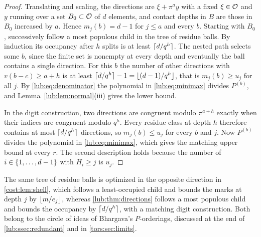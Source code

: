 \begin{proof}
Translating and scaling, the directions are $\xi+\pi^ay$ with a fixed $\xi\in\mathcal{O}$ and $y$
running over a set $B_0\subset\mathcal{O}$ of $d$ elements, and contact depths in $B$ are those in
$B_0$ increased by $a$. Hence $m_j(b)=d-1$ for
$j\le a$ and every $b$. Starting with $B_0$, successively follow a most populous child in
the tree of residue balls. By induction its occupancy after $h$ splits is at least
$\lceil d/q^h\rceil$. The nested path selects some $b$, since the finite set is nonempty at every
depth and eventually the ball contains a single direction. For this $b$ the number of
other directions with $v(b-c)\ge a+h$ is at least
$\lceil d/q^h\rceil-1=\lfloor(d-1)/q^h\rfloor$, that is $m_j(b)\ge u_j$ for all $j$. By
\eqref{lub:eq:denominator} the polynomial in \eqref{lub:eq:minimax} divides $P^{(b)}$, and
Lemma~\ref{lub:lem:normal}(iii) gives the lower bound.

In the digit construction, two directions are congruent modulo $\pi^{a+h}$ exactly when
their indices are congruent modulo $q^h$. Every residue class at depth $h$ therefore
contains at most $\lceil d/q^h\rceil$ directions, so $m_j(b)\le u_j$ for every $b$ and $j$. Now
$P^{(b)}$ divides the polynomial in \eqref{lub:eq:minimax}, which gives the matching upper
bound at every $r$. The second description holds because the number of
$i\in\{1,\dots,d-1\}$ with $H_i\ge j$ is $u_j$.
\end{proof}

\begin{remark}
The same tree of residue balls is optimized in the opposite direction in
\cref{cost:lem:shell}, which follows a least-occupied child and bounds the marks at depth
$j$ by $\lfloor m/e_j\rfloor$, whereas \cref{lub:thm:directions} follows a most populous child
and bounds the occupancy by $\lceil d/q^h\rceil$, with a matching digit construction. Both
belong to the circle of ideas of Bhargava's $P$-orderings, discussed at the end of
\cref{lub:ssec:redundant} and in \cref{tors:sec:limits}.
\end{remark}

